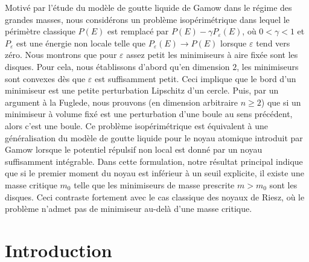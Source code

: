 \documentclass[JEP,XML,SOM,Unicode,published]{cedram}
\numberwithin{equation}{section}
\theoremstyle{plain}
\theoremstyle{definition}
\begin{document}




\begin{altabstract}
Motivé par l’étude du modèle de goutte liquide de Gamow dans le régime des grandes masses, nous considérons un problème isopérimétrique dans lequel le périmètre classique $P(E)$ est remplacé par $P(E)-\gamma P_\varepsilon(E)$, où $0<\gamma<1$ et $P_\varepsilon$ est une énergie non locale telle que $P_\varepsilon(E)\to P(E)$ lorsque $\varepsilon$ tend vers zéro. Nous montrons que pour $\varepsilon$ assez petit les minimiseurs à aire fixée sont les disques.
Pour cela, nous établissons d'abord qu'en dimension $2$, les minimiseurs sont convexes dès que $\varepsilon$ est suffisamment petit. Ceci implique que le bord d’un minimiseur est une petite perturbation Lipschitz d’un cercle. Puis, par un argument à la Fuglede, nous prouvons (en dimension arbitraire $n\geq 2$) que si un minimiseur à volume fixé est une perturbation d’une boule au sens précédent, alors c’est une boule.
Ce problème isopérimétrique est équivalent à une généralisation du modèle de goutte liquide pour le noyau atomique introduit par Gamow lorsque le potentiel répulsif non local est donné par un noyau suffisamment intégrable. Dans cette formulation, notre résultat principal indique que si le premier moment du noyau est inférieur à un seuil explicite, il existe une masse critique $m_0$ telle que les minimiseurs de masse prescrite $m>m_0$ sont les disques. Ceci contraste fortement avec le cas classique des noyaux de Riesz, où le problème n'admet pas de minimiseur au-delà d'une masse critique.
\end{altabstract}

\maketitle
\tableofcontents
\mainmatter

\section{Introduction}
\end{document}
